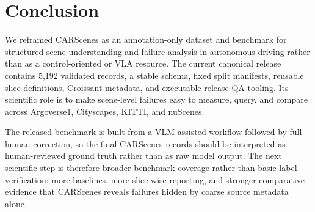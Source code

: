 \section{Conclusion}
\label{sec:conclusion}

We reframed CARScenes as an annotation-only dataset and benchmark for structured scene understanding and failure analysis in autonomous driving rather than as a control-oriented or VLA resource. The current canonical release contains 5,192 validated records, a stable schema, fixed split manifests, reusable slice definitions, Croissant metadata, and executable release QA tooling. Its scientific role is to make scene-level failures easy to measure, query, and compare across Argoverse1, Cityscapes, KITTI, and nuScenes.

The released benchmark is built from a VLM-assisted workflow followed by full human correction, so the final CARScenes records should be interpreted as human-reviewed ground truth rather than as raw model output. The next scientific step is therefore broader benchmark coverage rather than basic label verification: more baselines, more slice-wise reporting, and stronger comparative evidence that CARScenes reveals failures hidden by coarse source metadata alone.

